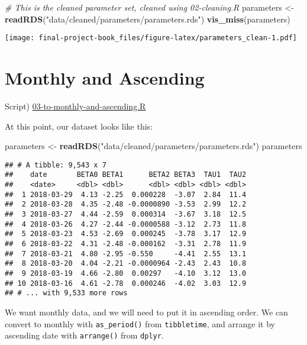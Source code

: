 \documentclass[]{book}
\newenvironment{Shaded}{\begin{snugshade}}{\end{snugshade}}
\newcommand{\CommentTok}[1]{\textcolor[rgb]{0.56,0.35,0.01}{\textit{#1}}}
\newcommand{\KeywordTok}[1]{\textcolor[rgb]{0.13,0.29,0.53}{\textbf{#1}}}
\newcommand{\NormalTok}[1]{#1}
\newcommand{\StringTok}[1]{\textcolor[rgb]{0.31,0.60,0.02}{#1}}
\begin{document}
\begin{Shaded}
\begin{Highlighting}[]
\CommentTok{# This is the cleaned parameter set, cleaned using 02-cleaning.R}
\NormalTok{parameters <-}\StringTok{ }\KeywordTok{readRDS}\NormalTok{(}\StringTok{"data/cleaned/parameters/parameters.rds"}\NormalTok{)}
\KeywordTok{vis_miss}\NormalTok{(parameters)}
\end{Highlighting}
\end{Shaded}

\texttt{[image: final-project-book\_files/figure-latex/parameters\_clean-1.pdf]}

\hypertarget{monthly}{%
\section{Monthly and Ascending}\label{monthly}}

Script)
\href{./R/03-to-monthly-and-ascending.R}{03-to-monthly-and-ascending.R}

At this point, our dataset looks like this:

\begin{Shaded}
\begin{Highlighting}[]
\NormalTok{parameters <-}\StringTok{ }\KeywordTok{readRDS}\NormalTok{(}\StringTok{"data/cleaned/parameters/parameters.rds"}\NormalTok{)}
\NormalTok{parameters}
\end{Highlighting}
\end{Shaded}

\begin{verbatim}
## # A tibble: 9,543 x 7
##    date       BETA0 BETA1      BETA2 BETA3  TAU1  TAU2
##    <date>     <dbl> <dbl>      <dbl> <dbl> <dbl> <dbl>
##  1 2018-03-29  4.13 -2.25  0.000228  -3.07  2.84  11.4
##  2 2018-03-28  4.35 -2.48 -0.0000890 -3.53  2.99  12.2
##  3 2018-03-27  4.44 -2.59  0.000314  -3.67  3.18  12.5
##  4 2018-03-26  4.27 -2.44 -0.0000588 -3.12  2.73  11.8
##  5 2018-03-23  4.53 -2.69  0.000245  -3.78  3.17  12.9
##  6 2018-03-22  4.31 -2.48 -0.000162  -3.31  2.78  11.9
##  7 2018-03-21  4.80 -2.95 -0.550     -4.41  2.55  13.1
##  8 2018-03-20  4.04 -2.21 -0.0000964 -2.43  2.43  10.8
##  9 2018-03-19  4.66 -2.80  0.00297   -4.10  3.12  13.0
## 10 2018-03-16  4.61 -2.78  0.000246  -4.02  3.03  12.9
## # ... with 9,533 more rows
\end{verbatim}

We want monthly data, and we will need to put it in ascending order. We
can convert to monthly with \texttt{as\_period()} from
\texttt{tibbletime}, and arrange it by ascending date with
\texttt{arrange()} from \texttt{dplyr}.
\end{document}
